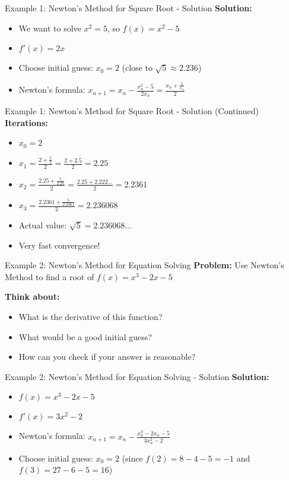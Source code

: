 \documentclass[aspectratio=169]{beamer}
\begin{document}
\begin{frame}{Example 1: Newton's Method for Square Root - Solution}
\textbf{Solution:}
\begin{itemize}
    \item We want to solve $x^2 = 5$, so $f(x) = x^2 - 5$
    \item $f'(x) = 2x$
    \item Choose initial guess: $x_0 = 2$ (close to $\sqrt{5} \approx 2.236$)
    \item Newton's formula: $x_{n+1} = x_n - \frac{x_n^2 - 5}{2x_n} = \frac{x_n + \frac{5}{x_n}}{2}$
\end{itemize}
\end{frame}

\begin{frame}{Example 1: Newton's Method for Square Root - Solution (Continued)}
\textbf{Iterations:}
\begin{itemize}
    \item $x_0 = 2$
    \item $x_1 = \frac{2 + \frac{5}{2}}{2} = \frac{2 + 2.5}{2} = 2.25$
    \item $x_2 = \frac{2.25 + \frac{5}{2.25}}{2} = \frac{2.25 + 2.222...}{2} = 2.2361$
    \item $x_3 = \frac{2.2361 + \frac{5}{2.2361}}{2} = 2.236068$
    \item Actual value: $\sqrt{5} = 2.236068...$
    \item Very fast convergence!
\end{itemize}
\end{frame}

\begin{frame}{Example 2: Newton's Method for Equation Solving}
\textbf{Problem:} Use Newton's Method to find a root of $f(x) = x^3 - 2x - 5$

\textbf{Think about:}
\begin{itemize}
    \item What is the derivative of this function?
    \item What would be a good initial guess?
    \item How can you check if your answer is reasonable?
\end{itemize}
\end{frame}

\begin{frame}{Example 2: Newton's Method for Equation Solving - Solution}
\textbf{Solution:}
\begin{itemize}
    \item $f(x) = x^3 - 2x - 5$
    \item $f'(x) = 3x^2 - 2$
    \item Newton's formula: $x_{n+1} = x_n - \frac{x_n^3 - 2x_n - 5}{3x_n^2 - 2}$
    \item Choose initial guess: $x_0 = 2$ (since $f(2) = 8 - 4 - 5 = -1$ and $f(3) = 27 - 6 - 5 = 16$)
\end{itemize}
\end{frame}
\end{document}
